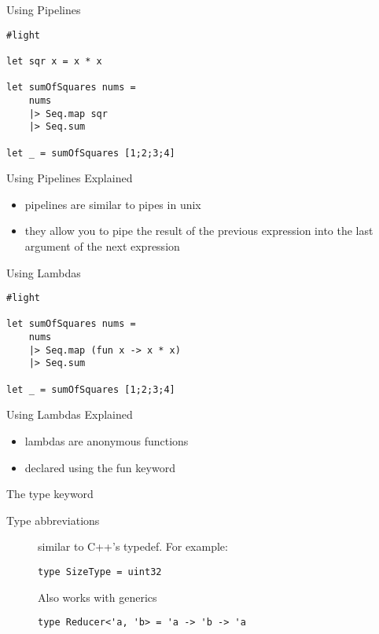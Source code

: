\documentclass[landscape]{slides}
\begin{document}
\begin{slide}{Using Pipelines}
\begin{verbatim}
#light

let sqr x = x * x

let sumOfSquares nums =
    nums 
    |> Seq.map sqr
    |> Seq.sum

let _ = sumOfSquares [1;2;3;4]
\end{verbatim}
\end{slide}

\begin{slide}{Using Pipelines Explained}
\begin{itemize}
\item pipelines are similar to pipes in unix
\item they allow you to pipe the result of the previous expression into the last argument of the next expression
\end{itemize}
\end{slide}

\begin{slide}{Using Lambdas}
\begin{verbatim}
#light

let sumOfSquares nums =
    nums 
    |> Seq.map (fun x -> x * x) 
    |> Seq.sum

let _ = sumOfSquares [1;2;3;4]
\end{verbatim}
\end{slide}

\begin{slide}{Using Lambdas Explained}
\begin{itemize}
\item lambdas are anonymous functions
\item declared using the fun keyword
\end{itemize}
\end{slide}

\begin{slide}{The type keyword}
\begin{description}
\item[Type abbreviations] similar to C++'s typedef. For example:
\begin{verbatim}
type SizeType = uint32
\end{verbatim}
Also works with generics
\begin{verbatim}
type Reducer<'a, 'b> = 'a -> 'b -> 'a
\end{verbatim}
\end{description}
\end{slide}
\end{document}
